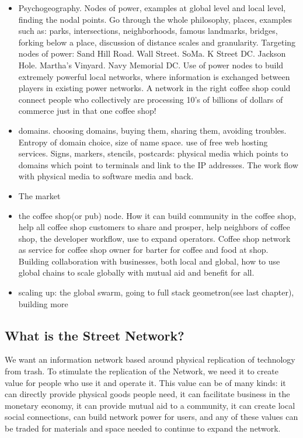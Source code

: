 \begin{itemize}
  \item
  Psychogeography.  Nodes of power, examples at global level and local level, finding the nodal points.  Go through the whole philosophy, places, examples such as: parks, intersections, neighborhoods, famous landmarks, bridges, forking below a place, discussion of distance scales and granularity.  Targeting nodes of power: Sand Hill Road. Wall Street. SoMa.  K Street DC. Jackson Hole. Martha's Vinyard.  Navy Memorial DC. Use of power nodes to build extremely powerful local networks, where information is exchanged between players in existing power networks.  A network in the right coffee shop could connect people who collectively are processing 10's of billions of dollars of commerce just in that one coffee shop!
  \item
  domains.  choosing domains, buying them, sharing them, avoiding troubles. Entropy of domain choice, size of name space. use of free web hosting services.  Signs, markers, stencils, postcards: physical media which points to domains which point to terminals and link to the IP addresses.  The work flow with physical media to software media and back.
  \item
  The market
  \item
  the coffee shop(or pub) node.  How it can build community in the coffee shop, help all coffee shop customers to share and prosper, help neighbors of coffee shop, the developer workflow, use to expand operators.  Coffee shop network as service for coffee shop owner for barter for coffee and food at shop.  Building collaboration with businesses, both local and global, how to use global chains to scale globally with mutual aid and benefit for all.
  \item
  scaling up: the global swarm, going to full stack geometron(see last chapter), building more 
\end{itemize}

\subsection{What is the Street Network?}

We want an information network based around physical replication of technology from trash.  To stimulate the replication of the Network, we need it to create value for people who use it and operate it. This value can be of many kinds: it can directly provide physical goods people need, it can facilitate business in the monetary economy, it can provide mutual aid to a community, it can create local social connections, can build network power for users, and any of these values can be traded for materials and space needed to continue to expand the network.  

